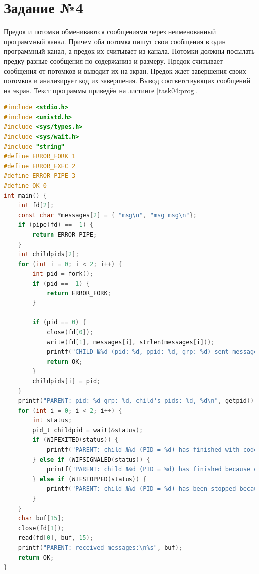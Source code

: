 \documentclass[12pt]{report}
\begin{document}
\section*{Задание №4}

Предок и потомки обмениваются сообщениями через неименованный программный канал. Причем оба потомка пишут свои сообщения в один программный канал, а предок их считывает из канала. Потомки должны посылать предку разные сообщения по содержанию и размеру. Предок считывает сообщения от потомков и выводит их на экран. Предок ждет завершения своих потомков и анализирует код их завершения. Вывод соответствующих сообщений на экран. Текст программы приведён на листинге \ref{task04:prog}.

\begin{lstlisting}[label=task04:prog,caption=Программные каналы,language=C]
#include <stdio.h>
#include <unistd.h>
#include <sys/types.h>
#include <sys/wait.h>
#include "string"
#define ERROR_FORK 1
#define ERROR_EXEC 2
#define ERROR_PIPE 3
#define OK 0
int main() {
    int fd[2];
    const char *messages[2] = { "msg\n", "msg msg\n"};
    if (pipe(fd) == -1) {
        return ERROR_PIPE;
    }
    int childpids[2];
    for (int i = 0; i < 2; i++) {
        int pid = fork();
        if (pid == -1) {
            return ERROR_FORK;
        }

        if (pid == 0) {
            close(fd[0]);
            write(fd[1], messages[i], strlen(messages[i]));
            printf("CHILD №%d (pid: %d, ppid: %d, grp: %d) sent message to parent\n", i + 1, getpid(), getppid(), getpgrp());
            return OK;
        }
        childpids[i] = pid;
    }
    printf("PARENT: pid: %d grp: %d, child's pids: %d, %d\n", getpid(), getpgrp(), childpids[0], childpids[1]);
    for (int i = 0; i < 2; i++) {
        int status;
        pid_t childpid = wait(&status);
        if (WIFEXITED(status)) {
            printf("PARENT: child №%d (PID = %d) has finished with code: %d\n", i + 1, childpid, WEXITSTATUS(status));
        } else if (WIFSIGNALED(status)) {
            printf("PARENT: child №%d (PID = %d) has finished because of signal: %d\n", i + 1, childpid, WTERMSIG(status));
        } else if (WIFSTOPPED(status)) {
            printf("PARENT: child №%d (PID = %d) has been stopped because of signal: %d\n", i + 1, childpid, WSTOPSIG(status));
        }
    }
    char buf[15];
    close(fd[1]);
    read(fd[0], buf, 15);
    printf("PARENT: received messages:\n%s", buf);
    return OK;
}
\end{lstlisting}
\end{document}
